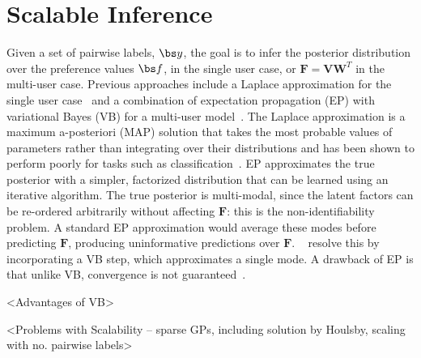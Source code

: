 \section{Scalable Inference}\label{sec:inf}

Given a set of pairwise labels, $\bs y$, 
the goal is to infer the posterior distribution over the preference values $\bs f$, in the single
user case, or $\mathbf F=\mathbf V \mathbf W^T$ in the multi-user case. 
Previous approaches include a Laplace approximation for the single user case~\cite{chu2005preference}
and a combination of expectation propagation (EP) with variational Bayes (VB) for a 
multi-user model~\cite{houlsby2012collaborative}.
The Laplace approximation is a maximum a-posteriori (MAP) solution that
takes the most probable values of parameters rather than integrating over their distributions
and has been shown to perform poorly for tasks such as classification~\cite{nickisch2008approximations}. 
EP approximates the true posterior with a simpler, factorized distribution
that can be learned using an iterative algorithm.
The true posterior is multi-modal, since the latent factors can be re-ordered arbitrarily without
affecting $\mathbf F$: this is the non-identifiability problem.
A standard EP approximation would average these modes before predicting $\mathbf F$,
producing uninformative predictions over $\mathbf F$.
~\citet{houlsby2012collaborative} resolve this by incorporating a VB step, which approximates a single mode.
A drawback of EP is that unlike VB, convergence is not guaranteed~\cite{minka2001expectation}.

<Advantages of VB>

<Problems with Scalability -- sparse GPs, including solution by Houlsby, scaling with no. pairwise labels>


